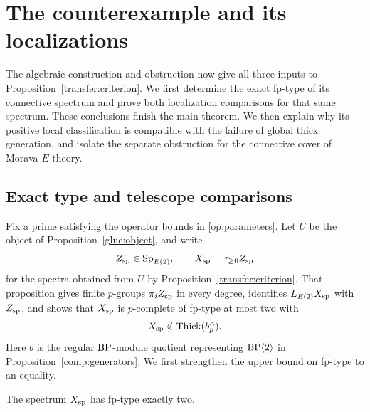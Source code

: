 \section{The counterexample and its localizations}
\label{scope:section}

The algebraic construction and obstruction now give all three inputs to
Proposition~\ref{transfer:criterion}.  We first determine the exact
fp-type of its connective spectrum and prove both localization comparisons
for that same spectrum.  These conclusions finish the main theorem.
We then explain why its positive local classification is compatible with
the failure of global thick generation, and isolate the separate obstruction
for the connective cover of Morava \(E\)-theory.

\subsection{Exact type and telescope comparisons}

Fix a prime satisfying the operator bounds in \eqref{op:parameters}.  Let
\(U\) be the object of Proposition~\ref{glue:object}, and write
\[
 Z_{\rm sp}\in\mathrm{Sp}_{E(2)},\qquad
 X_{\rm sp}=\tau_{\geq0}Z_{\rm sp}
\]
for the spectra obtained from \(U\) by Proposition~\ref{transfer:criterion}.
That proposition gives finite \(p\)-groups \(\pi_iZ_{\rm sp}\) in every
degree, identifies \(L_{E(2)}X_{\rm sp}\) with \(Z_{\rm sp}\), and shows
that \(X_{\rm sp}\) is \(p\)-complete of fp-type at most two with
\[
 X_{\rm sp}\notin\operatorname{Thick}(b_p^\wedge).
\]
Here \(b\) is the regular \(\mathrm{BP}\)-module quotient representing
\(\mathrm{BP}\langle2\rangle\) in Proposition~\ref{comp:generators}.  We first
strengthen the upper bound on fp-type to an equality.

\begin{proposition}
\label{scope:exact-height}
The spectrum \(X_{\rm sp}\) has fp-type exactly two.
\end{proposition}


